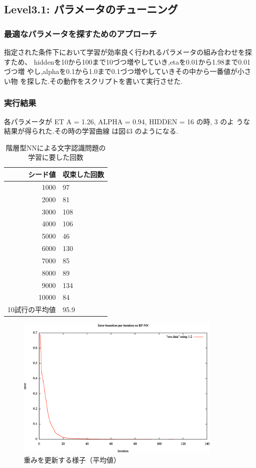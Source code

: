 \subsection{Level3.1: パラメータのチューニング}
\subsubsection{最適なパラメータを探すためのアプローチ}
指定された条件下において学習が効率良く行われるパラメータの組み合わせを探
すため、
hiddenを10から100まで10づつ増やしていき,etaを0.01から1.98まで0.01づつ増
やし,alphaを0.1から1.0まで0.1づつ増やしていきその中から一番値が小さい物
を探した.その動作をスクリプトを書いて実行させた.

\subsubsection{実行結果}
各パラメータが ET A = 1.26, ALPHA = 0.94, HIDDEN = 16 の時, 3 のよ
うな結果が得られた.その時の学習曲線 は図43 のようになる.
\begin{table}[htb]
 \begin{center}
  \caption{階層型NNによる文字認識問題の学習に要した回数}
  \label{table:level3}
  \begin{tabular}[htb]{r|l} \hline
   シード値 & 収束した回数 \\ \hline \hline
   1000 & 97 \\ \hline
   2000 & 81 \\ \hline
   3000 & 108 \\ \hline
   4000 & 106 \\ \hline
   5000 & 46 \\ \hline
   6000 & 130 \\ \hline
   7000 & 85 \\ \hline
   8000 & 89 \\ \hline
   9000 & 134 \\ \hline
   10000 & 84 \\ \hline \hline
   10試行の平均値 & 95.9 \\ \hline
  \end{tabular}
 \end{center}
\end{table}

\begin{figure}[h]
 \begin{center}
  \includegraphics[width=10.0cm]{ave.eps}
  \caption{重みを更新する様子（平均値）}
  \label{fig:level2}
 \end{center}
\end{figure}
\newpage


